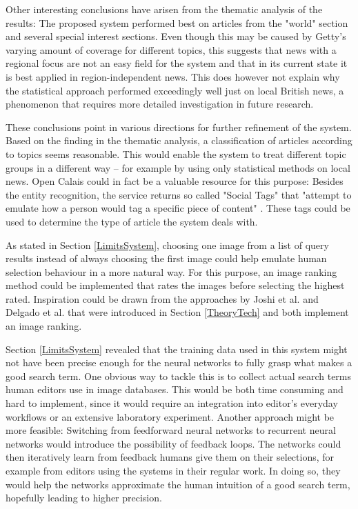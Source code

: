 \documentclass[11pt,a4paper,twoside]{article}
\begin{document}
Other interesting conclusions have arisen from the thematic analysis of the results: The proposed system performed best on articles from the "world" section and several special interest sections. Even though this may be caused by Getty's varying amount of coverage for different topics, this suggests that news with a regional focus are not an easy field for the system and that in its current state it is best applied in region-independent news. This does however not explain why the statistical approach performed exceedingly well just on local British news, a phenomenon that requires more detailed investigation in future research.

\bigskip

These conclusions point in various directions for further refinement of the system. Based on the finding in the thematic analysis, a classification of articles according to topics seems reasonable. This would enable the system to treat different topic groups in a different way -- for example by using only statistical methods on local news. Open Calais could in fact be a valuable resource for this purpose: Besides the entity recognition, the service returns so called "Social Tags" that "attempt to emulate how a person would tag a specific piece of content" \cite[p. 11]{ThomsonReuters2018ThomsonGuide}. These tags could be used to determine the type of article the system deals with.

As stated in Section \ref{LimitsSystem}, choosing one image from a list of query results instead of always choosing the first image could help emulate human selection behaviour in a more natural way. For this purpose, an image ranking method could be implemented that rates the images before selecting the highest rated. Inspiration could be drawn from the approaches by Joshi et al. \cite{Joshi2006TheIllustration} and Delgado et al. \cite{Delgado2010AutomatedExperience} that were introduced in Section \ref{TheoryTech} and both implement an image ranking.

Section \ref{LimitsSystem} revealed that the training data used in this system might not have been precise enough for the neural networks to fully grasp what makes a good search term. One obvious way to tackle this is to collect actual search terms human editors use in image databases. This would be both time consuming and hard to implement, since it would require an integration into editor's everyday workflows or an extensive laboratory experiment. Another approach might be more feasible: Switching from feedforward neural networks to recurrent neural networks would introduce the possibility of feedback loops. The networks could then iteratively learn from feedback humans give them on their selections, for example from editors using the systems in their regular work. In doing so, they would help the networks approximate the human intuition of a good search term, hopefully leading to higher precision.
\end{document}
